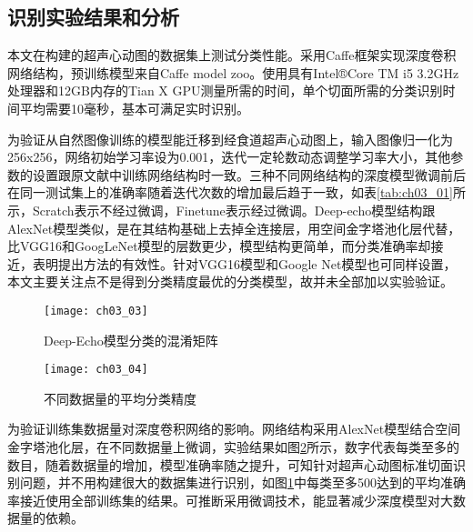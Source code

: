 \subsection{识别实验结果和分析}

本文在构建的超声心动图的数据集上测试分类性能。采用Caffe框架\citep{Jia2014}实现深度卷积网络结构，预训练模型来自Caffe model zoo。使用具有Intel®Core TM i5 3.2GHz处理器和12GB内存的Tian X GPU测量所需的时间，单个切面所需的分类识别时间平均需要10毫秒，基本可满足实时识别。

为验证从自然图像训练的模型能迁移到经食道超声心动图上，输入图像归一化为256x256，网络初始学习率设为0.001，迭代一定轮数动态调整学习率大小，其他参数的设置跟原文献中训练网络结构时一致。三种不同网络结构的深度模型微调前后在同一测试集上的准确率随着迭代次数的增加最后趋于一致，如表\ref{tab:ch03_01}所示，Scratch表示不经过微调，Finetune表示经过微调。Deep-echo模型结构跟AlexNet模型类似，是在其结构基础上去掉全连接层，用空间金字塔池化层代替，比VGG16和GoogLeNet模型的层数更少，模型结构更简单，而分类准确率却接近，表明提出方法的有效性。针对VGG16模型和Google Net模型也可同样设置，本文主要关注点不是得到分类精度最优的分类模型，故并未全部加以实验验证。
\begin{figure}[!htbp]
\centering
\texttt{[image: ch03\_03]}
\caption{Deep-Echo模型分类的混淆矩阵}
\label{fig:ch03_03}
\end{figure} 
\begin{figure}[!htbp]
    \centering
    \texttt{[image: ch03\_04]}
    \caption{不同数据量的平均分类精度}
    \label{fig:ch03_04}
    \end{figure} 
为验证训练集数据量对深度卷积网络的影响。网络结构采用AlexNet模型结合空间金字塔池化层，在不同数据量上微调，实验结果如图\ref{fig:ch03_04}所示，数字代表每类至多的数目，随着数据量的增加，模型准确率随之提升，可知针对超声心动图标准切面识别问题，并不用构建很大的数据集进行识别，如图\ref{fig:ch03_03}中每类至多500达到的平均准确率接近使用全部训练集的结果。可推断采用微调技术，能显著减少深度模型对大数据量的依赖。
